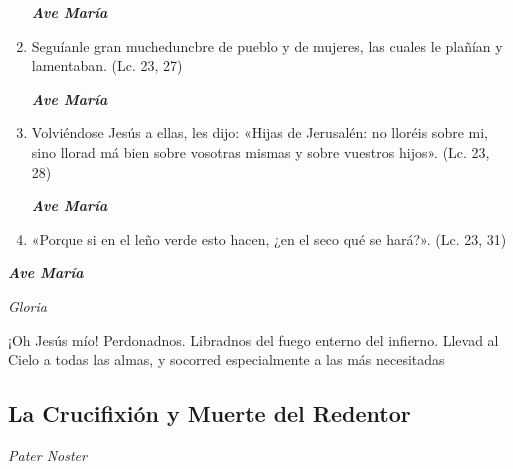 \documentclass[a4paper,11pt, oneside]{report}
\begin{document}
\begin{enumerate}
        \textbf{\textit{Ave María}}

        \item Seguíanle gran mucheduncbre de pueblo y de mujeres, las cuales le plañían y lamentaban. (Lc. 23, 27)

        \textbf{\textit{Ave María}}

        \item Volviéndose Jesús a ellas, les dijo: «Hijas de Jerusalén: no lloréis sobre mi, sino llorad má bien sobre vosotras mismas y sobre
        vuestros hijos». (Lc. 23, 28)

        \textbf{\textit{Ave María}}

        \item «Porque si en el leño verde esto hacen, ¿en el seco qué se hará?». (Lc. 23, 31)

      \end{enumerate}

      \textbf{\textit{Ave María}} \par
      \indent\textit{Gloria} \par
      \indent¡Oh Jesús mío! Perdonadnos. Libradnos del fuego enterno del infierno. Llevad al Cielo a todas las almas, y socorred especialmente a las más 
      necesitadas

    \subsection*{ La Crucifixión y Muerte del Redentor }
      
      \textit{Pater Noster}
\end{document}
